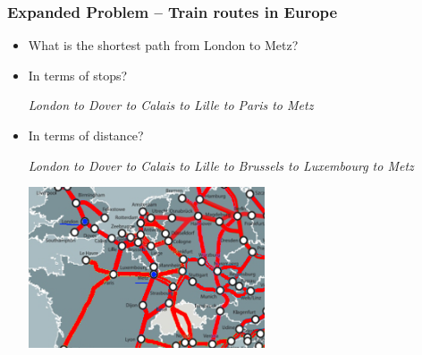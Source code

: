 \documentclass{beamer}
\begin{document}
\begin{frame}[fragile]
    \frametitle{Expanded Problem -- Train routes in Europe}
\begin{itemize}
\item What is the shortest path from London to Metz?

\item In terms of stops? 

\textit{London to Dover to Calais to Lille to Paris to Metz}

\item In terms of distance? 

\textit{London to Dover to Calais to Lille to Brussels to Luxembourg to Metz}

\includegraphics[width=7cm]{figures/london_trains.png}

\end{itemize}

\end{frame}
\end{document}
